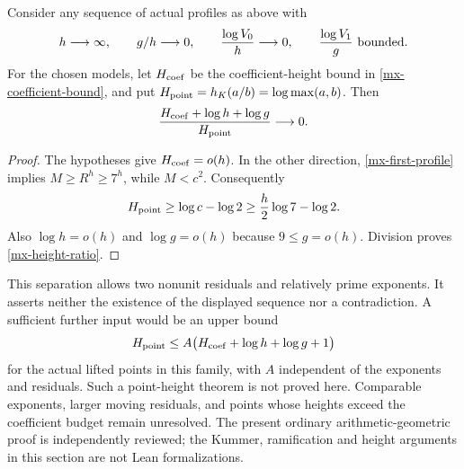 \begin{corollary}
\label{mx-height-separation}
Consider any sequence of actual profiles as above with
\begin{equation}\label{mx-sequence-domain}
 h\longrightarrow\infty,\qquad g/h\longrightarrow0,\qquad
 \frac{\log V_0}{h}\longrightarrow0,\qquad
 \frac{\log V_1}{g}\ \hbox{bounded}.
\end{equation}
For the chosen models, let $H_{\rm coef}$ be the coefficient-height
bound in \eqref{mx-coefficient-bound}, and put
$H_{\rm point}=h_K(a/b)=\log\max(a,b)$. Then
\begin{equation}\label{mx-height-ratio}
 \frac{H_{\rm coef}+\log h+\log g}{H_{\rm point}}
 \longrightarrow0.
\end{equation}
\end{corollary}
\begin{proof}
The hypotheses give $H_{\rm coef}=o(h)$. In the other direction,
\eqref{mx-first-profile} implies $M\ge R^h\ge7^h$, while
$M<c^2$. Consequently
\[
 H_{\rm point}\ge\log c-\log2
   \ge\frac h2\log7-\log2.
\]
Also $\log h=o(h)$ and $\log g=o(h)$ because $9\le g=o(h)$.
Division proves \eqref{mx-height-ratio}.
\end{proof}

This separation allows two nonunit residuals and relatively prime
exponents. It asserts neither the existence of the displayed
sequence nor a contradiction. A sufficient further input would be
an upper bound
\[
 H_{\rm point}\le A\bigl(H_{\rm coef}+\log h+\log g+1\bigr)
\]
for the actual lifted points in this family, with $A$ independent
of the exponents and residuals. Such a point-height theorem is
not proved here. Comparable exponents, larger moving residuals,
and points whose heights exceed the coefficient budget remain
unresolved. The present ordinary arithmetic-geometric proof is
independently reviewed; the Kummer, ramification and height
arguments in this section are not Lean formalizations.
